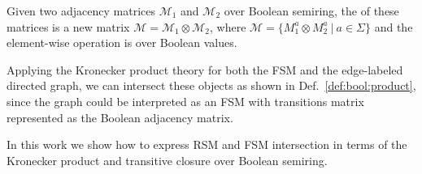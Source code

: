 \begin{definition}
\label{def:bool:product}
Given two adjacency matrices $\mathcal{M}_1$ and $\mathcal{M}_2$ over Boolean semiring, the  of these matrices is a new matrix
$\mathcal{M} = \mathcal{M}_1 \otimes \mathcal{M}_2$, where $\mathcal{M} = \{ M_1^a \otimes M_2^a~|~a \in \Sigma \}$ and the element-wise operation is  over Boolean values.

\end{definition}

Applying the Kronecker product theory for both the FSM and the edge-labeled directed graph, we can intersect these objects as shown in Def.~\ref{def:bool:product}, since the graph could be interpreted as an FSM with transitions matrix represented as the Boolean adjacency matrix.

In this work we show how to express RSM and FSM intersection in terms of
the Kronecker product and transitive closure over Boolean semiring.